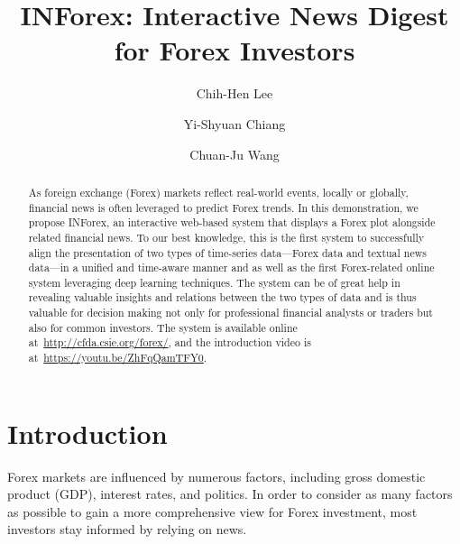 \documentclass[runningheads]{llncs}
\begin{document}
%
\title{INForex: Interactive News Digest for Forex Investors}
%
%
\author{Chih-Hen Lee\and
Yi-Shyuan Chiang \and
Chuan-Ju Wang}
%
%
%
\maketitle              %
%
\vspace{-0.6cm}
\begin{abstract}
As foreign exchange (Forex) markets reflect real-world events, locally or globally, financial news is often leveraged to predict Forex trends. 
In this demonstration, we propose INForex, an interactive web-based system that displays a Forex plot alongside related financial news. To our best knowledge, this is the first system to successfully align the presentation of two types of time-series data---Forex data and textual news data---in a unified and time-aware manner and as well as the first Forex-related online system leveraging deep learning techniques. 
The system can be of great help in revealing valuable insights and relations between the two types of data and is thus valuable for decision making not only for professional financial analysts or traders but also for common investors.
The system is available online at~\url{http://cfda.csie.org/forex/}, and the introduction video is at~\url{https://youtu.be/ZhFqQamTFY0}.

\end{abstract}
%
%
%
\vspace{-0.8cm}
\section{Introduction}
\vspace{-0.3cm}
Forex markets are influenced by numerous factors, including gross domestic product (GDP), interest rates, and politics.
In order to consider as many factors as possible to gain a more comprehensive view for Forex investment, most investors stay informed by relying on news.
\end{document}
